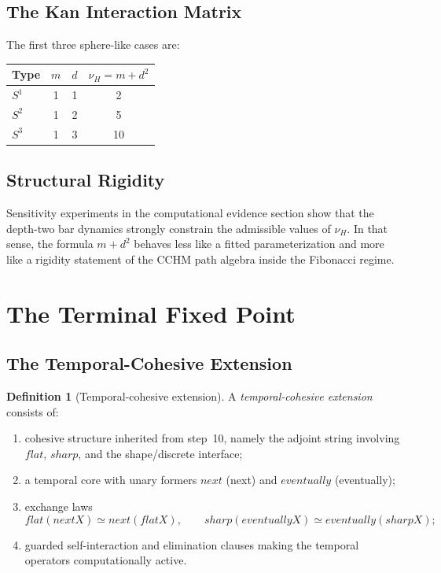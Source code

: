 \documentclass[11pt,a4paper]{article}
\def\flat{flat}%
\def\sharp{sharp}%
\def\bigcirc{next}%
\def\Diamond{eventually}%
\theoremstyle{plain}
\theoremstyle{definition}
\newtheorem{definition}[theorem]{Definition}
\theoremstyle{remark}
\begin{document}
\subsection{The Kan Interaction Matrix}

The first three sphere-like cases are:

\begin{center}
\small
\begin{tabular}{@{}lccc@{}}
\toprule
Type & $m$ & $d$ & $\nu_H=m+d^2$ \\
\midrule
$S^1$ & 1 & 1 & 2 \\
$S^2$ & 1 & 2 & 5 \\
$S^3$ & 1 & 3 & 10 \\
\bottomrule
\end{tabular}
\end{center}

\subsection{Structural Rigidity}

Sensitivity experiments in the computational evidence section show that the depth-two bar dynamics strongly constrain the admissible values of $\nu_H$.  In that sense, the formula $m+d^2$ behaves less like a fitted parameterization and more like a rigidity statement of the CCHM path algebra inside the Fibonacci regime.

\section{The Terminal Fixed Point}
\label{sec:terminal}

\subsection{The Temporal-Cohesive Extension}

\begin{definition}[Temporal-cohesive extension]
\label{def:dct}
A \emph{temporal-cohesive extension} consists of:
\begin{enumerate}[nosep]
    \item cohesive structure inherited from step~10, namely the adjoint string involving $\flat$, $\sharp$, and the shape/discrete interface;
    \item a temporal core with unary formers $\bigcirc$ (next) and $\Diamond$ (eventually);
    \item exchange laws
    \[
      \flat(\bigcirc X)\simeq \bigcirc(\flat X),
      \qquad
      \sharp(\Diamond X)\simeq \Diamond(\sharp X);
    \]
    \item guarded self-interaction and elimination clauses making the temporal operators computationally active.
\end{enumerate}
\end{definition}
\end{document}
